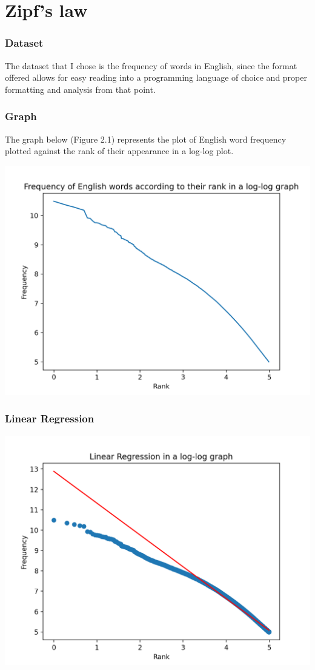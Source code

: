 \documentclass[english]{report}
\begin{document}
\chapter{Zipf's law}

\subsection{Dataset}

The dataset that I chose is the frequency of words in English, since the format offered allows for easy reading into a programming language of choice and proper formatting and analysis from that point.

\subsection{Graph}

The graph below (Figure 2.1) represents the plot of English word frequency plotted against the rank of their appearance in a log-log plot.

\includegraphics[scale=0.65]{histogram.png}

\subsection{Linear Regression}

\includegraphics[scale=0.65]{lr.png}
\end{document}
